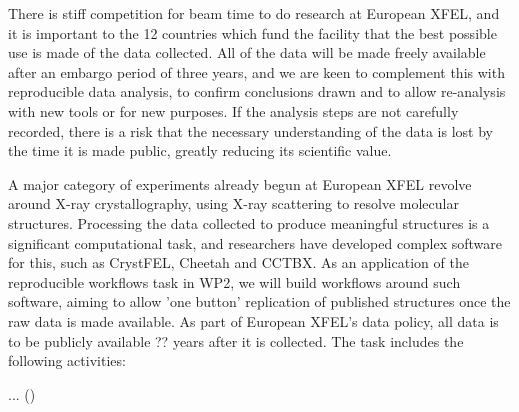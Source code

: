 \begin{task}[
  title=Reproducible X-ray crystallography workflows at European XFEL,
  id=reproducibility-euxfel,
  lead=XFEL,
  PM=36,
  wphases={0-48},
  partners={XFEL}
  ]

  There is stiff competition for beam time to do research at European XFEL,
  and it is important to the 12 countries 
  which fund the facility that the best possible use is made of the data collected.
  All of the data will be made freely available after an embargo period of
  three years, and we are keen to complement this with reproducible data
  analysis, to confirm conclusions drawn and to allow re-analysis with new
  tools or for new purposes. 
  If the analysis steps are not carefully recorded, there is a risk that the
  necessary understanding of the data is lost by the time it is made public,
  greatly reducing its scientific value.

  A major category of experiments already begun at European XFEL revolve around
  X-ray crystallography, using X-ray scattering to resolve molecular structures.
  Processing the data collected to produce meaningful structures is a
  significant computational task, and researchers have developed complex
  software for this, such as CrystFEL, Cheetah and CCTBX.
  As an application of the reproducible workflows task in WP2, we will build
  workflows around such software, aiming to allow 'one button' replication
  of published structures once the raw data is made available.
  As part of European XFEL's data policy, all data is to be publicly available
  ?? years after it is collected.
  The task includes the following activities:
  \begin{compactitem}
  \item ...
    ()
  \end{compactitem}

\end{task}
